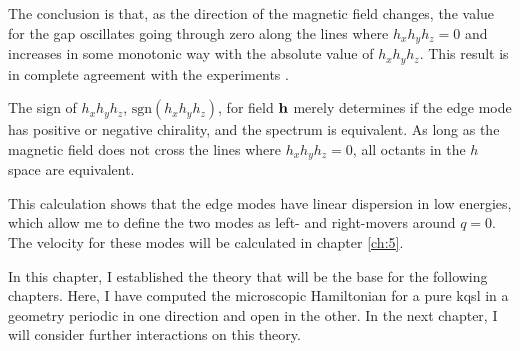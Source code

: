 








The conclusion is that, as the direction of the magnetic field changes, the value for the gap oscillates going through zero along the lines where $h_xh_yh_z=0$ and increases in some monotonic way with the absolute value of $h_xh_yh_z$. This result is in complete agreement with the experiments \cite{yokoi2020halfinteger, tanaka2020}.


The sign of $h_xh_yh_z$, $\text{sgn}(h_xh_yh_z)$, for field $\bf{h}$ merely determines if the edge mode has positive or negative chirality, and the spectrum is equivalent. %
As long as the magnetic field does not cross the lines where $h_xh_yh_z=0$, all octants in the $h$ space are equivalent.  %

This calculation shows that the edge modes have linear dispersion in low energies, which allow me to define the two modes as left- and right-movers around $q=0$.  The velocity for these modes will be calculated in chapter \ref{ch:5}.

In this chapter, I established the theory that will be the base for the following chapters. Here, I have computed the microscopic Hamiltonian for a pure \acrshort{kqsl} in a geometry periodic in one direction and open in the other. In the next chapter, I will consider further interactions on this theory.



  

